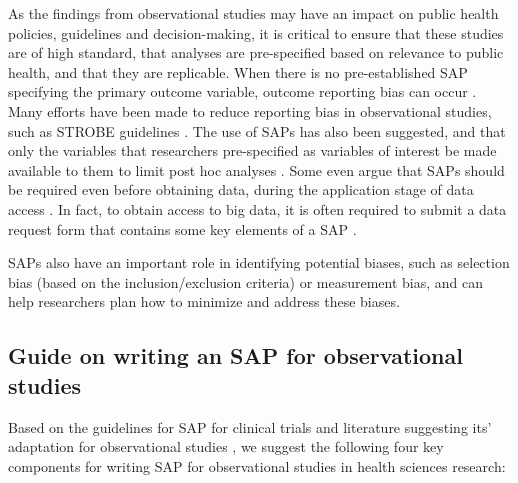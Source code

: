 \documentclass[
]{book}
\begin{document}
As the findings from observational studies may have an impact on public health policies, guidelines and decision-making, it is critical to ensure that these studies are of high standard, that analyses are pre-specified based on relevance to public health, and that they are replicable. When there is no pre-established SAP specifying the primary outcome variable, outcome reporting bias can occur \citep{cafri2018mitigating}. Many efforts have been made to reduce reporting bias in observational studies, such as STROBE guidelines \citep{von2007strengthening}. The use of SAPs has also been suggested, and that only the variables that researchers pre-specified as variables of interest be made available to them to limit post hoc analyses \citep{thomas2012value, williams2010registration}. Some even argue that SAPs should be required even before obtaining data, during the application stage of data access \citep{trinh2013statistical, hiemstra2019debate}. In fact, to obtain access to big data, it is often required to submit a data request form that contains some key elements of a SAP \citep{dars2021, popdata2021}.

SAPs also have an important role in identifying potential biases, such as selection bias (based on the inclusion/exclusion criteria) or measurement bias, and can help researchers plan how to minimize and address these biases.

\hypertarget{guide-on-writing-an-sap-for-observational-studies}{%
\subsection{Guide on writing an SAP for observational studies}\label{guide-on-writing-an-sap-for-observational-studies}}

Based on the guidelines for SAP for clinical trials \citep{gamble2017guidelines} and literature suggesting its' adaptation for observational studies \citep{yuan2019guide, thomas2012value, hiemstra2019debate}, we suggest the following four key components for writing SAP for observational studies in health sciences research:
\end{document}
